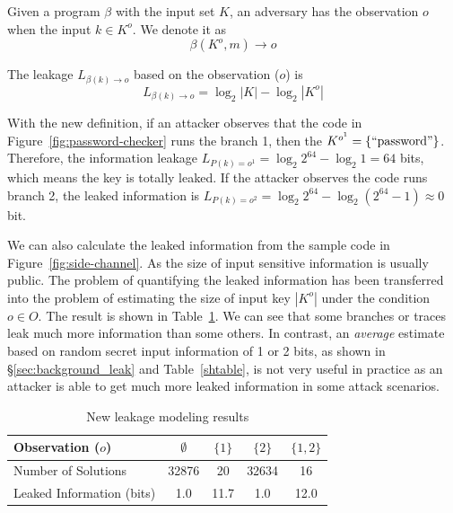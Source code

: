 \begin{mydef}
    \label{def}
    Given a program $\beta$ with the input set $K$,
    an adversary has the observation $o$ when the input $k{\in}K^o$.
    We denote it as
    $$\beta(K^o, m) \rightarrow	o$$

    The leakage $L_{\beta(k)\rightarrow o}$ based on the observation ($o$) is
    $$L_{\beta(k)\rightarrow o} = \log_2{|K|} - \log_2{|K^o|}$$
\end{mydef}

With the new definition, if an attacker observes that the
code in Figure~\ref{fig:password-checker} runs the branch 1, then the $K^{o^{1}} =
\{\mathrm{``password"}\}$. Therefore, the information leakage $L_{P(k)=o^{1}} =
\log_2{2^{64}} - \log_2{1} = 64$ bits, which means the key is totally leaked. If the
attacker observes the code runs branch 2, the leaked information is
$L_{P(k)=o^{2}} = \log_2{2^{64}} - \log_2{(2^{64}-1)} \approx 0$ bit.


We can also calculate the leaked information from the sample code in
Figure~\ref{fig:side-channel}. As the size of input sensitive
information is usually public. The problem of quantifying the leaked information
has been transferred into the problem of estimating the size of input key
$|K^o|$ under the condition $o \in O$. The result is shown in
Table~\ref{shtable2}. We can see that some branches or traces leak much more
information than some others. In contrast, an \emph{average} estimate based on
random secret input information of 1 or 2 bits, as shown in
\S\ref{sec:background_leak} and Table~\ref{shtable}, is not very useful in
practice as an attacker is able to get much more leaked information in some
attack scenarios.

\begin{table}[ht]
    \centering
    \caption{New leakage modeling results}
    \label{shtable2}
    \begin{tabular}{l|cccc}
        \hline
        Observation ($o$)         & $\emptyset$ & ${\{1\}}$ & ${\{2\}}$ & ${\{1, 2\}}$ \\ \hline
        Number of Solutions       & 32876       & 20        & 32634     & 16           \\ \hline
        Leaked Information (bits) & 1.0         & 11.7      & 1.0       & 12.0         \\
        \hline
    \end{tabular}
\end{table}

